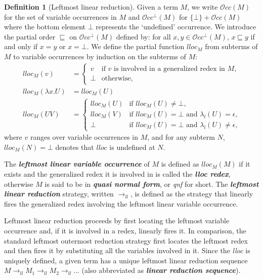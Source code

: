 \documentclass[xchauthor,chkrefs,GCNS,amsmath,amsthm,rotating,leaveRGB]{tcsg}
\renewcommand{\index}[1]{}
\theoremstyle{plain}
\theoremstyle{definition}
\newtheorem{definition}{Definition}[section]
\newcommand{\VarOcc}{\mathcal{O}{cc}}
\newcommand{\llred}{\rightarrow_{ll}}
\begin{document}
\begin{definition}[Leftmost linear reduction]\label{def:leftmostlinearreduction}
Given a term $M$, we write $\VarOcc (M)$ for the set of variable occurrences
in $M$ and $\VarOcc ^\bot (M)$ for $\{\bot \} + \VarOcc (M)$ where the bottom
element $\bot $ represents the `undefined' occurrence. We introduce the
partial order $\sqsubseteq $ on $\VarOcc ^\bot (M)$ defined by: for all $x,y
\in \VarOcc ^\bot (M)$, $x \sqsubseteq y$ if and only if $x = y$ or $x = \bot
$. We define the partial function $lloc_{M}$ from subterms of $M$ to variable
occurrences by induction on the subterms of $M$:
%
\begin{align*}
lloc_{M}(v) &=
    \begin{cases}
    v &\mbox{if $v$ is involved in a generalized redex in $M$,} \\
    \bot & \mbox {otherwise,}
    \end{cases}  \\
lloc_{M}(\lambda x . U) &= lloc_{M}(U) \\
lloc_{M}(U V) &= \begin{cases}
                lloc_{M}(U) &\mbox{if $lloc_{M}(U)\neq \bot $,} \\
                lloc_{M}(V) &\mbox{if $lloc_{M}(U)=\bot $ and $\lambda _{l}(U) = \epsilon $,} \\
                \bot & \mbox{if $lloc_{M}(U)=\bot $ and $\lambda _{l}(U) \neq \epsilon $,}
              \end{cases}
\end{align*}
%
where $v$ ranges over variable occurrences in $M$, and for any subterm $N$,
$lloc_{M}(N) = \bot $ denotes that $lloc$ is undefined at $N$.

The \textbf{\emph{leftmost linear variable occurrence}}\index{leftmost linear
variable occurrence} of $M$ is defined as $lloc_{M}(M)$ if it exists and the
generalized redex it is involved in is called the \textbf{\emph{lloc
redex}}\index{lloc redex}, otherwise $M$ is said to be in \textbf{\emph{quasi
normal form}}\index{quasi normal form}, or \emph{qnf} for short. The
\textbf{\emph{leftmost linear reduction}}\index{leftmost linear reduction}
strategy, written $\llred $, is defined as the strategy that linearly fires
the generalized redex involving the leftmost linear variable occurrence.
\end{definition}

Leftmost linear reduction proceeds by first locating the leftmost variable
occurrence and, if it is involved in a redex, linearly fires it. In
comparison, the standard leftmost outermost reduction strategy first locates
the leftmost redex and then fires it by substituting all the variables
involved in it. Since the \emph{lloc} is uniquely defined, a given term has a
unique leftmost linear reduction sequence $M \llred M_{1} \llred M_{2} \llred
\ldots $ (also abbreviated as \textbf{\emph{linear reduction
sequence}}\index{linear reduction sequence}).
\end{document}
